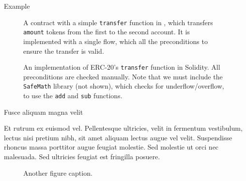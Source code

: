 \documentclass[usenames, dvipsnames, final]{beamer}
\newlength{\colwidth}
\begin{document}
\begin{frame}[t]
\begin{columns}[t]
\begin{column}{\colwidth}
  \begin{block}{Example}
    \begin{figure}[h]
        \centering
        
        \caption{A contract with a simple \lstinline{transfer} function in \langName, which transfers \lstinline{amount} tokens from the first to the second account.
    It is implemented with a single flow, which all the preconditions to ensure the transfer is valid.}
        \label{fig:erc20-transfer-flow}
    \end{figure}
    \begin{figure}[h]
        \centering
        
        \caption{An implementation of ERC-20's \lstinline{transfer} function in Solidity.
            All preconditions are checked manually.
            Note that we must include the \lstinline{SafeMath} library (not shown), which checks for underflow/overflow, to use the \lstinline{add} and \lstinline{sub} functions.}
        \label{fig:erc20-transfer-sol}
    \end{figure}
  \end{block}

  \begin{block}{Fusce aliquam magna velit}

    Et rutrum ex euismod vel. Pellentesque ultricies, velit in fermentum
    vestibulum, lectus nisi pretium nibh, sit amet aliquam lectus augue vel
    velit. Suspendisse rhoncus massa porttitor augue feugiat molestie. Sed
    molestie ut orci nec malesuada. Sed ultricies feugiat est fringilla
    posuere.

    \begin{figure}
      \centering
      \caption{Another figure caption.}
    \end{figure}

  \end{block}
\end{column}


\end{columns}
\end{frame}
\end{document}
